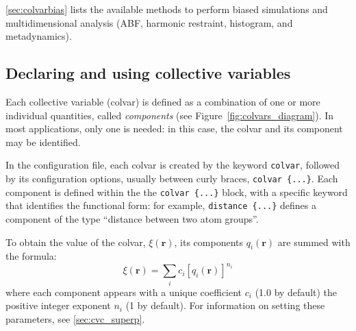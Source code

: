 \ref{sec:colvarbias} lists the available methods to perform biased
simulations and multidimensional analysis (ABF, harmonic restraint,
histogram, and metadynamics).


\subsection{Declaring and using collective variables}
\label{sec:colvar}

Each collective variable (colvar) is defined as a combination of one
or more individual quantities, called \emph{components} (see
Figure~\ref{fig:colvars_diagram}).  In most applications, only one is
needed: in this case, the colvar and its component may be identified.

In the configuration file, each colvar is created by the keyword
\texttt{colvar}, followed by its configuration options, usually
between curly braces, \texttt{colvar~\{...\}}.  Each component is
defined within the the \texttt{colvar~\{...\}} block, with a specific
keyword that identifies the functional form: for example,
\texttt{distance \{...\}} defines a component of the type ``distance
between two atom groups''.

To obtain the value of the colvar, $\xi(\mathbf{r})$, its components
$q_{i}(\mathbf{r})$ are summed with the formula:
\begin{equation}
  \label{eq:colvar_combination}
  \xi(\mathbf{r}) = \sum_{i} c_{i} [q_{i}(\mathbf{r})]^{n_{i}}
\end{equation}
where each component appears with a unique coefficient $c_{i}$ (1.0 by
default) the positive integer exponent $n_{i}$ (1 by default).
For information on setting these parameters, see \ref{sec:cvc_superp}.


